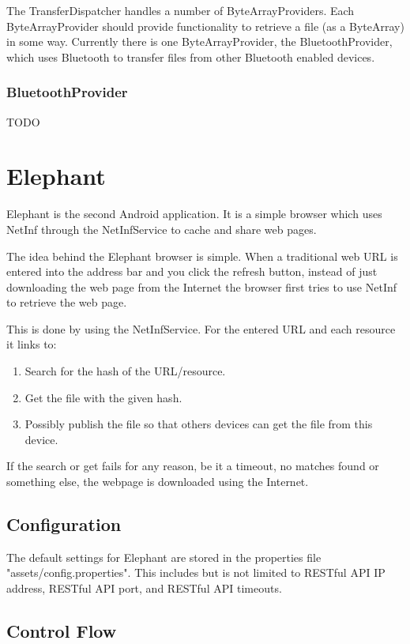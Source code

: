 The TransferDispatcher handles a number of ByteArrayProviders. Each ByteArrayProvider should provide functionality to retrieve a file (as a ByteArray) in some way. Currently there is one ByteArrayProvider, the BluetoothProvider, which uses Bluetooth to transfer files from other Bluetooth enabled devices.

\subsubsection{BluetoothProvider}

TODO

\section{Elephant}
\label{sec:Elephant}

Elephant is the second Android application. It is a simple browser which uses NetInf through the NetInfService to cache and share web pages.

The idea behind the Elephant browser is simple. When a traditional web URL is entered into the address bar and you click the refresh button, instead of just downloading the web page from the Internet the browser first tries to use NetInf to retrieve the web page.

This is done by using the NetInfService. For the entered URL and each resource it links to:
\begin{enumerate}
	\item Search for the hash of the URL/resource.
	\item Get the file with the given hash.
	\item Possibly publish the file so that others devices can get the file from this device.
\end{enumerate}

If the search or get fails for any reason, be it a timeout, no matches found or something else, the webpage is downloaded using the Internet.

\subsection{Configuration}

The default settings for Elephant are stored in the properties file "assets/config.properties". This includes but is not limited to RESTful API IP address, RESTful API port, and RESTful API timeouts.

\subsection{Control Flow}
\label{sec:Control Flow}

